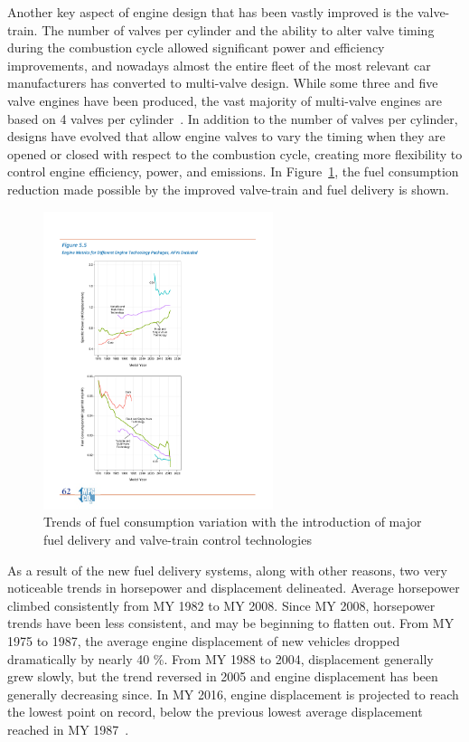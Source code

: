 \documentclass[12pt]{report}   %
\begin{document}
Another key aspect of engine design that has been vastly improved is the valve-train. The number of valves per cylinder and the ability to alter valve timing during the combustion cycle allowed significant power and efficiency improvements, and nowadays almost the entire fleet of the most relevant car manufacturers has converted to multi-valve design. While some three and five valve engines have been produced, the vast majority of multi-valve engines are based on 4 valves per cylinder~\cite{EPA2016}. In addition to the number of valves per cylinder, designs have evolved that allow engine valves to vary the timing when they are opened or closed with respect to the combustion cycle, creating more flexibility to control engine efficiency, power, and emissions. In Figure~\ref{fig:improvement_valve_fuel_delivery}, the fuel consumption reduction made possible by the improved valve-train and fuel delivery is shown. 

\begin{figure}[ht]
  \centering
  \includegraphics[width=0.6\textwidth]{figures/review/improvement_valve_fuel_delivery.pdf}
  \caption{Trends of fuel consumption variation with the introduction of major fuel delivery and valve-train control technologies \label{fig:improvement_valve_fuel_delivery} }
\end{figure}

As a result of the new fuel delivery systems, along with other reasons, two very noticeable trends in horsepower and displacement delineated. Average horsepower climbed consistently from MY 1982 to MY 2008. Since MY 2008, horsepower trends have been less consistent, and may be beginning to flatten out. From MY 1975 to 1987, the average engine displacement of new vehicles dropped dramatically by nearly 40 \%. From MY 1988 to 2004, displacement generally grew slowly, but the trend reversed in 2005 and engine displacement has been generally decreasing since. In MY 2016, engine displacement is projected to reach the lowest point on record, below the previous lowest average displacement reached in MY 1987~\cite{EPA2016}.
\end{document}
